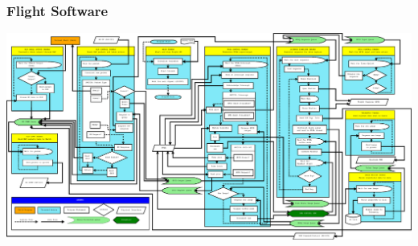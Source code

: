 \documentclass[landscape,xcolor={table}]{beamer}
\begin{document}
	\begin{frame}
		
		\frametitle{Flight Software}
		
		\includegraphics[width=\textwidth]{images/mfsw_block}

	\end{frame}
	
\end{document}
